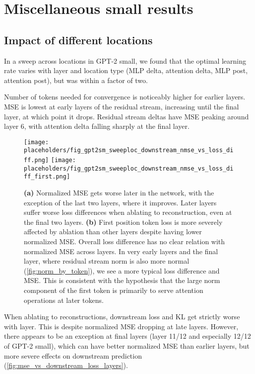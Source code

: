 \section{Miscellaneous small results}


\subsection{Impact of different locations}
\label{sec:layer_location_impact}

In a sweep across locations in GPT-2 small, we found that the optimal learning rate varies with layer and location type (MLP delta, attention delta, MLP post, attention post), but was within a factor of two.

Number of tokens needed for convergence is noticeably higher for earlier layers.  MSE is lowest at early layers of the residual stream, increasing until the final layer, at which point it drops.  Residual stream deltas have MSE peaking around layer 6, with attention delta falling sharply at the final layer.  %



\begin{figure}
    \centering
    \texttt{[image: placeholders/fig\_gpt2sm\_sweeploc\_downstream\_nmse\_vs\_loss\_diff.png]}
    \texttt{[image: placeholders/fig\_gpt2sm\_sweeploc\_downstream\_nmse\_vs\_loss\_diff\_first.png]}
    \caption{\textbf{(a)} Normalized MSE gets worse later in the network, with the exception of the last two layers, where it improves.  Later layers suffer worse loss differences when ablating to reconstruction, even at the final two layers. \textbf{(b)} First position token loss is more severely affected by ablation than other layers despite having lower normalized MSE.  Overall loss difference has no clear relation with normalized MSE across layers.  In very early layers and the final layer, where residual stream norm is also more normal (\autoref{fig:norm_by_token}), we see a more typical loss difference and MSE. This is consistent with the hypothesis that the large norm component of the first token is primarily to serve attention operations at later tokens.
    }
    \label{fig:mse_vs_downstream_loss_layers}
\end{figure}

When ablating to reconstructions, downstream loss and KL get strictly worse with layer.  This is despite normalized MSE dropping at late layers.  However, there appears to be an exception at final layers (layer 11/12 and especially 12/12 of GPT-2 small), which can have better normalized MSE than earlier layers, but more severe effects on downstream prediction (\autoref{fig:mse_vs_downstream_loss_layers}).


